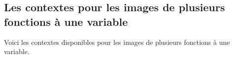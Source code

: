 \documentclass[10pt, a4paper]{tutodoc}
\begin{document}

\subsection{Les contextes pour les images de plusieurs fonctions à une variable}

Voici les contextes disponibles pour les images de plusieurs fonctions à une variable.

\medskip

\begin{itemize*}[before = \leavevmode\kern15pt, itemjoin = \kern15pt]
	\item {}

	\item {}
\end{itemize*}
\end{document}
